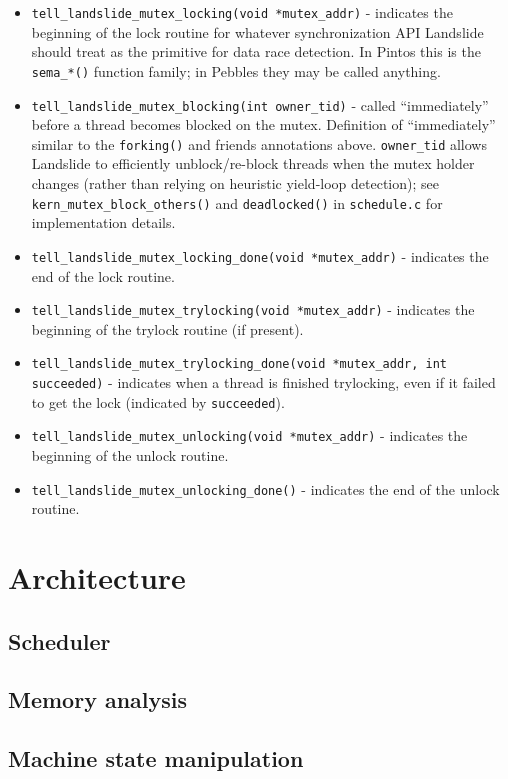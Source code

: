 \begin{itemize}
\item {\tt tell\_landslide\_mutex\_locking(void *mutex\_addr)} - indicates the beginning of the lock routine for
	whatever synchronization API Landslide should treat as the primitive for data race detection.
	In Pintos this is the {\tt sema\_*()} function family; in Pebbles they may be called anything.
\item {\tt tell\_landslide\_mutex\_blocking(int owner\_tid)} - called ``immediately'' before a thread becomes blocked on the mutex.
	Definition of ``immediately'' similar to the {\tt forking()} and friends annotations above.
	{\tt owner\_tid} allows Landslide to efficiently unblock/re-block threads when the mutex holder changes
	(rather than relying on heuristic yield-loop detection);
	see {\tt kern\_mutex\_block\_others()} and {\tt deadlocked()} in {\tt schedule.c} for implementation details.
\item {\tt tell\_landslide\_mutex\_locking\_done(void *mutex\_addr)} - indicates the end of the lock routine.
\item {\tt tell\_landslide\_mutex\_trylocking(void *mutex\_addr)} - indicates the beginning of the trylock routine (if present).
\item {\tt tell\_landslide\_mutex\_trylocking\_done(void *mutex\_addr, int succeeded)} -
	indicates when a thread is finished trylocking, even if it failed to get the lock (indicated by {\tt succeeded}).
\item {\tt tell\_landslide\_mutex\_unlocking(void *mutex\_addr)} - indicates the beginning of the unlock routine.
\item {\tt tell\_landslide\_mutex\_unlocking\_done()} - indicates the end of the unlock routine.
\end{itemize}

\section{Architecture}

\subsection{Scheduler}
\subsection{Memory analysis}
\subsection{Machine state manipulation}
